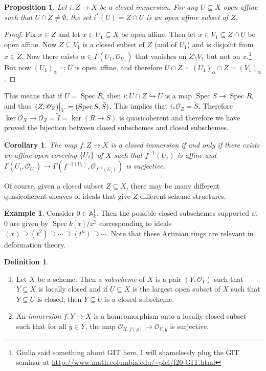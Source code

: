 \documentclass[leqno, openany]{memoir}
\newtheorem{cor}[thm]{Corollary}
\newtheorem{prop}[thm]{Proposition}
\theoremstyle{definition}
\newtheorem{defn}[thm]{Definition}
\newtheorem{exm}[thm]{Example}
\theoremstyle{remark}
\theoremstyle{plain}
\theoremstyle{definition}
\theoremstyle{remark}
\newcommand{\A}{\mathbb{A}}
\newcommand{\msc}[1]{\mathscr{#1}}
\newcommand{\wt}[1]{\widetilde{#1}}
\DeclareMathOperator{\Spec}{Spec}
\begin{document}
\begin{prop}
    Let $i \colon Z \to X$ be a closed immersion. For any $U \subseteq X$ open affine such that $U \cap Z \neq \emptyset$, the set $i^* (U) = Z \cap U$ is an open affine subset of $Z$.
\end{prop}

\begin{proof}
    Fix $x \in Z$ and let $x \in U_1 \subseteq X$ be open affine. Then let $x \in V_1 \subseteq Z \cap U$ be open affine. Now $Z \subseteq V_1$ is a closed subset of $Z$ (and of $U_1$) and is disjoint from $x \in Z$. Now there exists $\alpha \in \Gamma(U_1, \msc{O}_{U_1})$ that vanishes on $Z \setminus V_1$ but not on $x$.\footnote{Giulia said something about GIT here. I will shamelessly plug the GIT seminar at \url{http://www.math.columbia.edu/~plei/f20-GIT.html}} But now ${(U_1)}_{\alpha} \eqqcolon U$ is open affine, and therefore $U \cap Z = {(U_1)}_{\alpha} \cap Z = {(V_1)}_{\alpha}$.
\end{proof}

This means that if $U = \Spec R$, then $i \colon U \cap Z \hookrightarrow U$ is a map $\Spec S \to \Spec R$, and thus $\eval{ (Z, \msc{O}_Z) }_V = (\Spec S, \wt{S})$. This implies that $i_* \msc{O}_Z = \wt{S}$. Therefore $\ker \msc{O}_X \to \msc{O}_Z = \wt{I} = \wt{\ker (R \to S)}$ is quasicoherent and therefore we have proved the bijection between closed subschemes and closed subschemes.

\begin{cor}
    The map $f \colon Z \to X$ is a closed immersion if and only if there exists an affine open covering $\qty{U_i}$ of $X$ such that $f^{-1}(U_i)$ is affine and $\Gamma(U_i, \msc{O}_{U_i}) \to \Gamma(f^{-1(U_i)}, \msc{O}_{f^{-1}(U_i)})$ is surjective.
\end{cor}

Of course, given a closed subset $Z \subseteq X$, there may be many different quasicoherent sheaves of ideals that give $Z$ different scheme structures.

\begin{exm}
    Consider $0 \in \A^1_k$. Then the possible closed subschemes supported at $0$ are given by $\Spec k[x]/x^2$ corresponding to ideals $(x) \supseteq (t^2) \supseteq \cdots \supseteq (t^n) \supseteq \cdots$. Note that these Artinian rings are relevant in deformation theory.
\end{exm}

\begin{defn}
    \begin{enumerate}
        \item Let $X$ be a scheme. Then a \textit{subscheme} of $X$ is a pair $(Y, \msc{O}_Y)$ such that $Y \subseteq X$ is locally closed and if $U \subseteq X$ is the largest open subset of $X$ such that $Y \subseteq U$ is closed, then $Y \subseteq U$ is a closed subscheme.
        \item An \textit{immersion} $f \colon Y \to X$ is a homeomorphism onto a locally closed subset such that for all $y \in Y$, the map $\msc{O}_{X,f(y)} \to \msc{O}_{Y,y}$ is surjective.
    \end{enumerate}
\end{defn}
\end{document}

